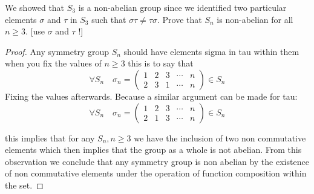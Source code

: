 \documentclass[11pt]{article}
\theoremstyle{definition}  %
\newcommand{\bigline}{\\\noindent\makebox[\linewidth]{\rule{\paperwidth}{0.4pt}}\\}
\begin{document}
 We showed that $S_3$ is a non-abelian group since we identified two particular elements $\sigma$ and $\tau$ in $S_3$ such that $\sigma \tau \neq \tau \sigma$.
 Prove that $S_n$ is non-abelian for all $n\geq 3$. [use $\sigma$ and $\tau$ !]\\
 \begin{proof}
 Any symmetry group $S_n$ should have elements sigma in tau within them when you fix the values of $n\geq 3$ this is to say that
 \[
   \forall S_n\quad  \sigma_n=\left( \begin{array}{ccccc} 1 & 2 & 3&\cdots&n\\
2 & 3 & 1 &\cdots&n\end{array} \right )\in S_n
 \]
 Fixing the values afterwards. Because a similar argument can be made for tau:
 \[
   \forall S_n\quad  \sigma_n=\left( \begin{array}{ccccc} 1 & 2 & 3&\cdots&n\\
 2 & 1 & 3 &\cdots&n\end{array} \right )\in S_n
 \]

  this implies that for any $S_n, n\geq 3$ we have the inclusion of two non commutative elements which then implies that the group as a whole is not abelian. From this observation we conclude that any symmetry group is non abelian by the existence of non commutative elements under the operation of function composition within the set.


 \end{proof}
 \bigline
\end{document}
